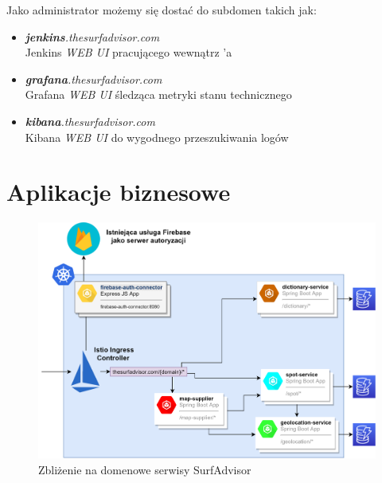 Jako administrator możemy się dostać do subdomen takich jak:

\begin{itemize}
    \item
    \emph{\textbf{jenkins}.thesurfadvisor.com}\\ 
    Jenkins \emph{WEB UI} pracującego wewnątrz 'a

    \item
    \emph{\textbf{grafana}.thesurfadvisor.com}\\
    Grafana \emph{WEB UI} śledząca metryki stanu technicznego

    \item
    \emph{\textbf{kibana}.thesurfadvisor.com}\\
    Kibana \emph{WEB UI} do wygodnego przeszukiwania logów
\end{itemize} 



\section{Aplikacje biznesowe}

\begin{figure}[!ht]
	\begin{center}
		\includegraphics[width=1\textwidth]{img/surf-services}
	\end{center}
	\caption{Zbliżenie na domenowe serwisy SurfAdvisor}
\end{figure}

